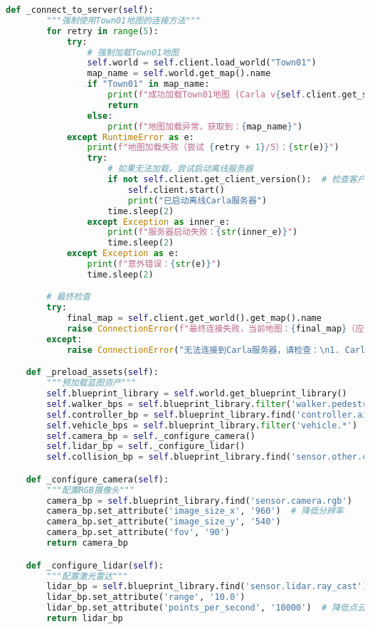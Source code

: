 \begin{lstlisting}[language=Python]
    def _connect_to_server(self):
        """强制使用Town01地图的连接方法"""
        for retry in range(5):
            try:
                # 强制加载Town01地图
                self.world = self.client.load_world("Town01")
                map_name = self.world.get_map().name
                if "Town01" in map_name:
                    print(f"成功加载Town01地图 (Carla v{self.client.get_server_version()})")
                    return
                else:
                    print(f"地图加载异常，获取到：{map_name}")
            except RuntimeError as e:
                print(f"地图加载失败（尝试 {retry + 1}/5）：{str(e)}")
                try:
                    # 如果无法加载，尝试启动离线服务器
                    if not self.client.get_client_version():  # 检查客户端连接
                        self.client.start()
                        print("已启动离线Carla服务器")
                    time.sleep(2)
                except Exception as inner_e:
                    print(f"服务器启动失败：{str(inner_e)}")
                    time.sleep(2)
            except Exception as e:
                print(f"意外错误：{str(e)}")
                time.sleep(2)

        # 最终检查
        try:
            final_map = self.client.get_world().get_map().name
            raise ConnectionError(f"最终连接失败，当前地图：{final_map}（应使用Town01）")
        except:
            raise ConnectionError("无法连接到Carla服务器，请检查：\n1. Carla服务器是否运行\n2. 端口2000是否可用")

    def _preload_assets(self):
        """预加载蓝图资产"""
        self.blueprint_library = self.world.get_blueprint_library()
        self.walker_bps = self.blueprint_library.filter('walker.pedestrian.*')
        self.controller_bp = self.blueprint_library.find('controller.ai.walker')
        self.vehicle_bps = self.blueprint_library.filter('vehicle.*')
        self.camera_bp = self._configure_camera()
        self.lidar_bp = self._configure_lidar()
        self.collision_bp = self.blueprint_library.find('sensor.other.collision')

    def _configure_camera(self):
        """配置RGB摄像头"""
        camera_bp = self.blueprint_library.find('sensor.camera.rgb')
        camera_bp.set_attribute('image_size_x', '960')  # 降低分辨率
        camera_bp.set_attribute('image_size_y', '540')
        camera_bp.set_attribute('fov', '90')
        return camera_bp

    def _configure_lidar(self):
        """配置激光雷达"""
        lidar_bp = self.blueprint_library.find('sensor.lidar.ray_cast')
        lidar_bp.set_attribute('range', '10.0')
        lidar_bp.set_attribute('points_per_second', '10000')  # 降低点云密度
        return lidar_bp


\end{lstlisting}
